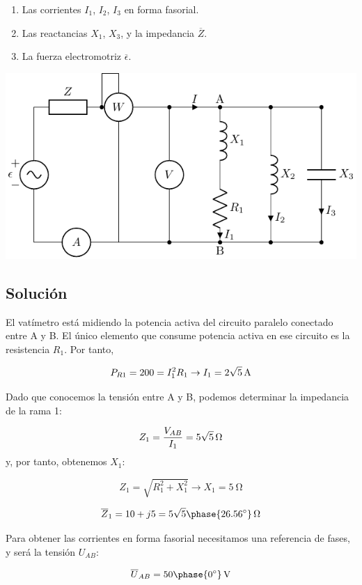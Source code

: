 \begin{enumerate}
\item Las corrientes $I_1$, $I_2$, $I_3$ en forma fasorial.
\item Las reactancias $X_1$, $X_3$, y la impedancia $\overline{Z}$.
\item La fuerza electromotriz $\overline{\epsilon}$.
\end{enumerate}
\begin{center}
  \includegraphics{figuras/BT2_circuitoCapacitivo}
\end{center}

\subsection*{Solución}


El vatímetro está midiendo la potencia activa del circuito paralelo conectado entre A y B. El único elemento que consume potencia activa en ese circuito es la resistencia $R_1$. Por tanto,

\[
  P_{R1} = 200 = I_1^2 R_1 \rightarrow I_1 = \qty[parse-numbers=false]{2\sqrt{5}}{\ampere}
\]

Dado que conocemos la tensión entre A y B, podemos determinar la impedancia de la rama 1:

\[
  Z_1 = \frac{V_{AB}}{I_1} = \qty[parse-numbers=false]{5\sqrt{5}}{\ohm}
\]
y, por tanto, obtenemos $X_1$:

\[
  Z_1 = \sqrt{R_1^2 + X_1^2} \rightarrow X_1 = \qty{5}{\ohm}
\]

\[
  \overline{Z}_1 = 10 + j5 = \qty[parse-numbers=false]{5\sqrt{5}\phase{\ang{26.56}}}{\ohm} 
\]

Para obtener las corrientes en forma fasorial necesitamos una referencia de fases, y será la tensión $U_{AB}$:

\[
  \overline{U}_{AB} = \qty[parse-numbers=false]{50\phase{\ang{0}}}{\volt}
\]

